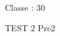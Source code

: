 \documentclass[a4paper,11pt,fleqn]{article}
\begin{document}
\begin{block}
\vspace{0.5cm}
\begin{minipage}{0.47\linewidth}
Classe : 30
\end{minipage}
\hfill {}
\begin{minipage}{0.5\linewidth}
TEST 2 Pre2
\end{minipage}
\hfill {}

\end{block}

\vfill


\vfill
\end{document}
